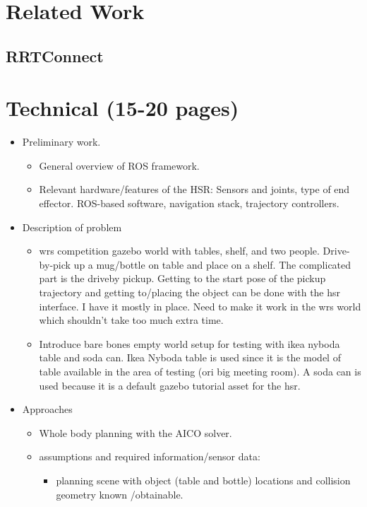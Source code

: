 \documentclass[12pt]{article}
\begin{document}
\section{Related Work}
    \subsection{RRTConnect}
        

\section{Technical (15-20 pages)}
    \begin{itemize}
        \item Preliminary work.
        \begin{itemize}
            \item General overview of ROS framework.
            \item Relevant hardware/features of the HSR: Sensors and joints, type of end effector. ROS-based software, navigation stack, trajectory controllers.
        \end{itemize}
        \item Description of problem
        \begin{itemize}
            \item wrs competition gazebo world with tables, shelf, and two people. Drive-by-pick up a mug/bottle on table and place on a shelf. The complicated part is the driveby pickup. Getting to the start pose of the pickup trajectory and getting to/placing the object can be done with the hsr interface. I have it mostly in place. Need to make it work in the wrs world which shouldn't take too much extra time. 
            \item Introduce bare bones empty world setup for testing with ikea nyboda table and soda can. Ikea Nyboda table is used since it is the model of table available in the area of testing (ori big meeting room). A soda can is used because it is a default gazebo tutorial asset for the hsr.
        \end{itemize}
        \item Approaches
        \begin{itemize}
            \item Whole body planning with the AICO solver.
            \item assumptions and required information/sensor data:
            \begin{itemize}
                \item planning scene with object (table and bottle) locations and collision geometry known /obtainable.

\end{itemize}
\end{itemize}
\end{itemize}
\end{document}
